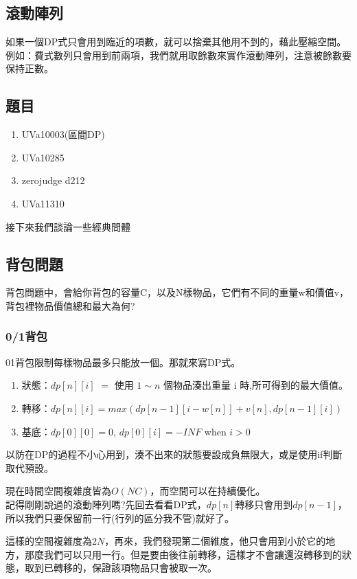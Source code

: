 \subsection{滾動陣列}
如果一個DP式只會用到臨近的項數，就可以捨棄其他用不到的，藉此壓縮空間。
例如：費式數列只會用到前兩項，我們就用取餘數來實作滾動陣列，注意被餘數要保持正數。

\subsection{題目}
\begin{enumerate}
\item UVa10003(區間DP)
\item UVa10285
\item zerojudge d212
\item UVa11310
\end{enumerate}
接下來我們談論一些經典問體
\subsection{背包問題}
背包問題中，會給你背包的容量C，以及N樣物品，它們有不同的重量w和價值v，背包裡物品價值總和最大為何?
\subsubsection{0/1背包}
01背包限制每樣物品最多只能放一個。那就來寫DP式。
\begin{enumerate}
\item 狀態：$dp[n][i]$ $=$ 使用 $1 ∼ n$ 個物品湊出重量 i 時,所可得到的最大價值。
\item 轉移：$dp[n][i] = max(dp[n − 1][i − w[n]] + v[n], dp[n − 1][i])$
\item 基底：$dp[0][0] = 0$, $dp[0][i] = −INF$ when $i>0$
\end{enumerate}
以防在DP的過程不小心用到，湊不出來的狀態要設成負無限大，或是使用if判斷取代預設。

現在時間空間複雜度皆為$O(NC)$，而空間可以在持續優化。\\
記得剛剛說過的滾動陣列嗎?先回去看看DP式，$dp[n]$轉移只會用到$dp[n-1]$，所以我們只要保留前一行(行列的區分我不管)就好了。

這樣的空間複雜度為$2N$，再來，我們發現第二個維度，他只會用到小於它的地方，那麼我們可以只用一行。但是要由後往前轉移，這樣才不會讓還沒轉移到的狀態，取到已轉移的，保證該項物品只會被取一次。

